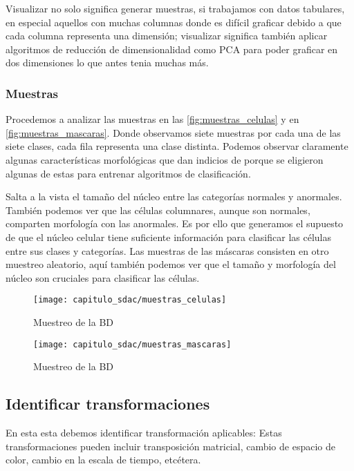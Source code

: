 Visualizar no solo significa generar muestras, si trabajamos con datos
tabulares, en especial aquellos con muchas columnas donde es difícil graficar
debido a que cada columna representa una dimensión; visualizar significa también
aplicar algoritmos de reducción de dimensionalidad como PCA para poder graficar
en dos dimensiones lo que antes tenia muchas más.

\subsubsection{Muestras}

Procedemos a analizar las muestras en las \autoref{fig:muestras_celulas} y en
\autoref{fig:muestras_mascaras}. Donde observamos siete muestras por cada una de
las siete clases, cada fila representa una clase distinta. Podemos observar
claramente algunas características morfológicas que dan indicios de porque se
eligieron algunas de estas para entrenar algoritmos de clasificación.

Salta a la vista el tamaño del núcleo entre las categorías normales y anormales.
También podemos ver que las células columnares, aunque son normales, comparten
morfología con las anormales. Es por ello que generamos el supuesto de que el
núcleo celular tiene suficiente información para clasificar las células entre
sus clases y categorías. Las muestras de las máscaras consisten en otro muestreo
aleatorio, aquí también podemos ver que el tamaño y morfología del núcleo son
cruciales para clasificar las células.

\begin{figure}[]
    \centering
    \texttt{[image: capitulo\_sdac/muestras\_celulas]}
    \caption{Muestreo de la BD}\label{fig:muestras_celulas}
\end{figure}

\begin{figure}[]
    \centering
    \texttt{[image: capitulo\_sdac/muestras\_mascaras]}
    \caption{Muestreo de la BD}\label{fig:muestras_mascaras}
\end{figure}

\subsection{Identificar transformaciones}

En esta esta debemos identificar transformación aplicables: Estas
transformaciones pueden incluir transposición matricial, cambio de espacio de
color, cambio en la escala de tiempo, etcétera.

